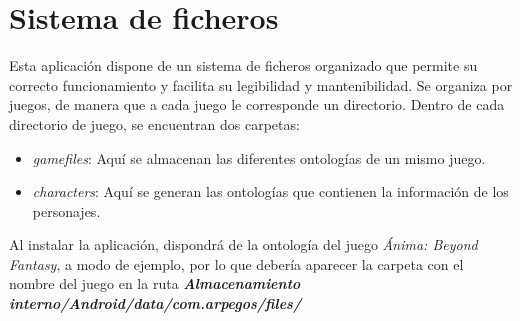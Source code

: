 
\section{Sistema de ficheros}
Esta aplicación dispone de un sistema de ficheros organizado que permite su correcto funcionamiento y 
facilita su legibilidad y mantenibilidad. Se organiza por juegos, de manera que a cada juego le corresponde
un directorio. Dentro de cada directorio de juego, se encuentran dos carpetas:
\begin{itemize}
    \item \textit{gamefiles}: Aquí se almacenan las diferentes ontologías de un mismo juego.
    \item \textit{characters}: Aquí se generan las ontologías que contienen la información de los personajes.
\end{itemize}

Al instalar la aplicación, dispondrá de la ontología del juego \textit{Ánima: Beyond Fantasy}, a modo de 
ejemplo, por lo que debería aparecer la carpeta con el nombre del juego en la ruta \label{Ruta_ficheros}
\textit{\textbf{Almacenamiento interno/Android/data/com.arpegos/files/}}